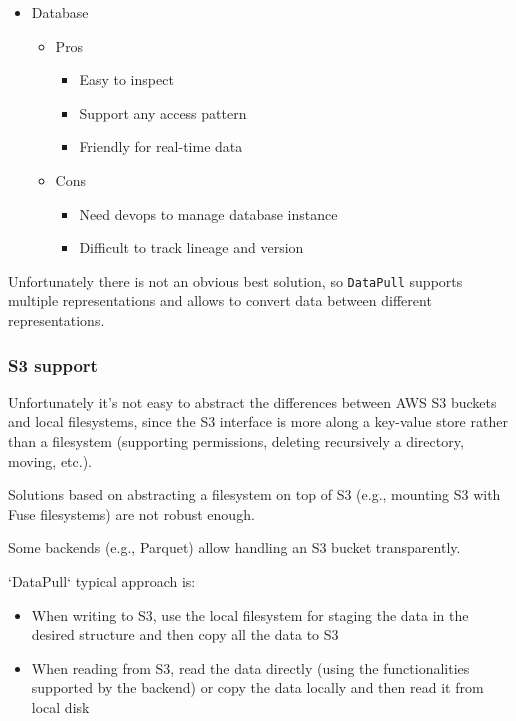 \documentclass[11pt, reqno]{amsart}
\theoremstyle{definition}
\theoremstyle{remark}
\begin{document}
\begin{itemize}
    \item Database
      \begin{itemize}
        \item Pros
          \begin{itemize}
            \item Easy to inspect

            \item Support any access pattern

            \item Friendly for real-time data
          \end{itemize}

        \item Cons
          \begin{itemize}
            \item Need devops to manage database instance

            \item Difficult to track lineage and version
          \end{itemize}
      \end{itemize}
  \end{itemize}

  Unfortunately there is not an obvious best solution, so \verb|DataPull|
  supports multiple representations and allows to convert data between different
  representations.

  \subsubsection{S3 support}
  Unfortunately it's not easy to abstract the differences between AWS S3 buckets
  and local filesystems, since the S3 interface is more along a key-value store rather
  than a filesystem (supporting permissions, deleting recursively a directory,
  moving, etc.).

  Solutions based on abstracting a filesystem on top of S3 (e.g., mounting S3
  with Fuse filesystems) are not robust enough.

  Some backends (e.g., Parquet) allow handling an S3 bucket transparently.

  `DataPull` typical approach is:

  \begin{itemize}
    \item When writing to S3, use the local filesystem for staging the data in
      the desired structure and then copy all the data to S3

    \item When reading from S3, read the data directly (using the functionalities
      supported by the backend) or copy the data locally and then read it from
      local disk
  \end{itemize}
\end{document}
